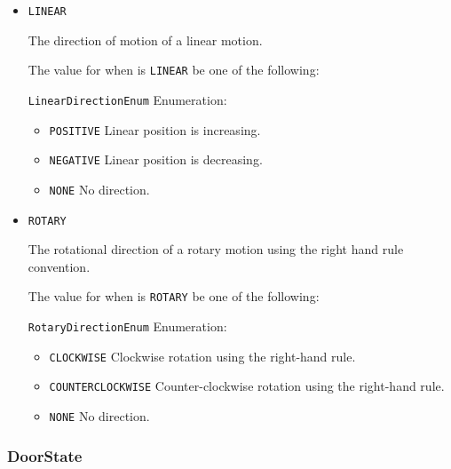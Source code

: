 \begin{itemize}

\item \texttt{LINEAR}


The direction of motion of a linear motion.


The value for  when  is \texttt{LINEAR} \MUST be one of the following: 


\texttt{LinearDirectionEnum} Enumeration:

\begin{itemize}
\item \texttt{POSITIVE} \newline Linear position is increasing. 
\item \texttt{NEGATIVE} \newline Linear position is decreasing. 
\item \texttt{NONE} \newline No direction. 
\end{itemize}

\item \texttt{ROTARY}


The rotational direction of a rotary motion using the right hand rule convention.


The value for  when  is \texttt{ROTARY} \MUST be one of the following: 


\texttt{RotaryDirectionEnum} Enumeration:

\begin{itemize}
\item \texttt{CLOCKWISE} \newline Clockwise rotation using the right-hand rule. 
\item \texttt{COUNTER\textunderscore CLOCKWISE} \newline Counter-clockwise rotation using the right-hand rule. 
\item \texttt{NONE} \newline No direction. 
\end{itemize}


\end{itemize}





\subsubsection{DoorState}
\label{sec:DoorState}



